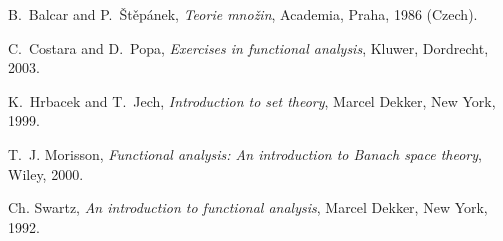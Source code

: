 \documentclass[12pt]{article}
\begin{document}
\begin{thebibliography}{1}

B.~Balcar and P.~{\v{S}}t\v{e}p\'anek, \emph{Teorie mno\v{z}in},
Academia,
  Praha, 1986 (Czech).

C.~Costara and D.~Popa, \emph{Exercises in functional analysis},
Kluwer,
  Dordrecht, 2003.

K.~Hrbacek and T.~Jech, \emph{{Introduction to set theory}},
{Marcel Dekker},
  New York, 1999.

T.~J. Morisson, \emph{Functional analysis: An introduction to
{B}anach space
  theory}, Wiley, 2000.

Ch. Swartz, \emph{An introduction to functional analysis}, Marcel
Dekker, New
  York, 1992.

\end{thebibliography}
\end{document}
